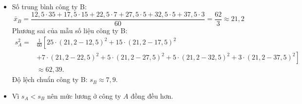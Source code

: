 \begin{ex}[Mức độ 3]
{\begin{itemize}
			$$\bar{x}_A=\dfrac{12,5\cdot 15+17,5\cdot 18+22,5\cdot 10+27,5\cdot 10+32,5\cdot 5+37,5\cdot 2}{60}=\dfrac{62}{3}\approx 20,7$$
			Phương sai của mẫu số liệu công ty A:
			$$
			\begin{aligned}
				s^2_A  =&\frac{1}{60}\left[15\cdot(20,7-12,5)^2+18\cdot(20,7-17,5)^2\right. \\
				& +10\cdot(20,7-22,5)^2+10\cdot(20,7-27,5)^2+5\cdot(20,7-32,5)^2+2\cdot(20,7-37,5)^2 \left. \right]\\
				&  \approx 49,14.
			\end{aligned}
			$$
			Độ lệch chuẩn công ty A: $s_A\approx 7$.
			\item Số trung bình công ty B:
			$$\bar{x}_B=\dfrac{12,5\cdot 35+17,5\cdot 15+22,5\cdot 7+27,5\cdot 5+32,5\cdot 5+37,5\cdot 3}{60}=\dfrac{62}{3}\approx 21,2$$
			Phương sai của mẫu số liệu công ty B:
			$$
			\begin{aligned}
				s^2_A  =&\frac{1}{60}\left[25\cdot(21,2-12,5)^2+15\cdot(21,2-17,5)^2\right. \\
				& +7\cdot(21,2-22,5)^2+5\cdot(21,2-27,5)^2+5\cdot(21,2-32,5)^2+3\cdot(21,2-37,5)^2 \left. \right]\\
				&  \approx 62,39.
			\end{aligned}
			$$
			Độ lệch chuẩn công ty B: $s_B\approx 7,9$.
			\item Vì $s_A<s_B$ nên mức lương ở công ty $A$ đồng đều hơn.
		\end{itemize}			
	}
\end{ex}

